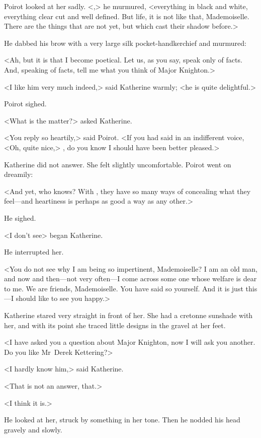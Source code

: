 Poirot looked at her sadly. <,> he murmured, <everything in black and white, everything clear cut and well defined. But life, it is not like that, Mademoiselle. There are the things that are not yet, but which cast their shadow before.>

He dabbed his brow with a very large silk pocket-handkerchief and murmured:

<Ah, but it is that I become poetical. Let us, as you say, speak only of facts. And, speaking of facts, tell me what you think of Major Knighton.>

<I like him very much indeed,> said Katherine warmly; <he is quite delightful.>

Poirot sighed.

<What is the matter?> asked Katherine.

<You reply so heartily,> said Poirot. <If you had said in an indifferent voice, <Oh, quite nice,> , do you know I should have been better pleased.>

Katherine did not answer. She felt slightly uncomfortable. Poirot went on dreamily:

<And yet, who knows? With , they have so many ways of concealing what they feel—and heartiness is perhaps as good a way as any other.>

He sighed.

<I don't see\longdash> began Katherine.

He interrupted her.

<You do not see why I am being so impertinent, Mademoiselle? I am an old man, and now and then—not very often—I come across some one whose welfare is dear to me. We are friends, Mademoiselle. You have said so yourself. And it is just this—I should like to see you happy.>

Katherine stared very straight in front of her. She had a cretonne sunshade with her, and with its point she traced little designs in the gravel at her feet.

<I have asked you a question about Major Knighton, now I will ask you another. Do you like Mr~Derek Kettering?>

<I hardly know him,> said Katherine.

<That is not an answer, that.>

<I think it is.>

He looked at her, struck by something in her tone. Then he nodded his head gravely and slowly.

